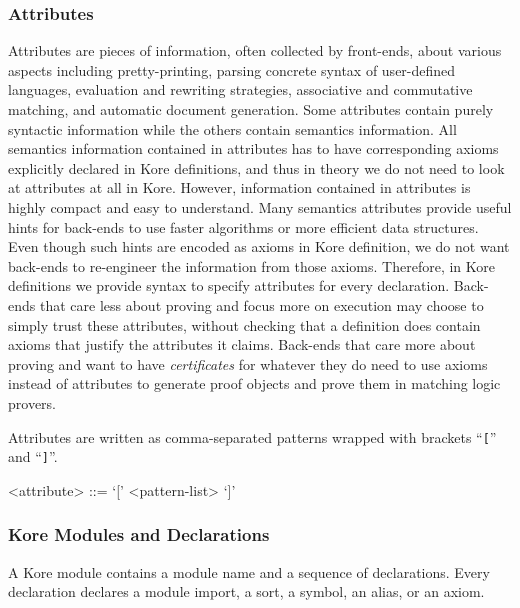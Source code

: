 \documentclass[UTF8,11pt]{article}
\theoremstyle{plain}
\theoremstyle{definition}
\theoremstyle{remark}
\begin{document}
\subsubsection{Attributes}
\label{sec:kore-attributes}

Attributes are pieces of information, often collected by front-ends, about 
various aspects including pretty-printing, parsing concrete syntax of 
user-defined languages, 
evaluation and rewriting strategies,
associative and commutative matching,
and automatic document generation.
Some attributes contain purely syntactic information while the others contain 
semantics information.
All semantics information contained in attributes has to have corresponding 
axioms explicitly declared in Kore definitions, and thus in theory we do not 
need to look at attributes at all in Kore.
However, information contained in attributes is highly compact and easy to 
understand.
Many semantics attributes provide useful hints for back-ends to use faster 
algorithms or more efficient data structures.
Even though such hints are encoded as axioms in Kore definition, we do not want 
back-ends to re-engineer the information from those axioms.
Therefore, in Kore definitions we provide syntax to specify attributes for 
every declaration.
Back-ends that care less about proving and focus more on execution may choose 
to simply trust these attributes, without checking that a definition does 
contain axioms that justify the attributes it claims.
Back-ends that care more about proving and want to have \emph{certificates} for 
whatever they do need to use axioms instead of attributes to generate proof 
objects and prove them in matching logic provers.

Attributes are written as comma-separated patterns wrapped with brackets 
``\texttt{[}'' and ``\texttt{]}''.
\begin{grammar}
<attribute> ::= `[' <pattern-list> `]'
\end{grammar}


\subsubsection{Kore Modules and Declarations}
\label{sec:kore-syntax-declarations}

A Kore module contains a module name and a sequence of declarations.
Every declaration declares a module import, a sort, a symbol, an alias, or an 
axiom.
\end{document}
